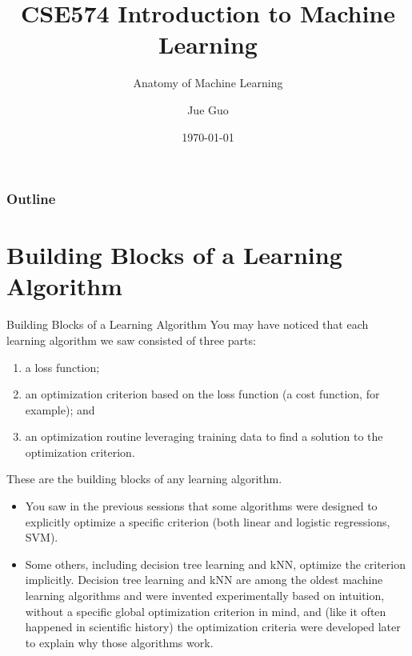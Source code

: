 \documentclass[9pt,dvipsnames]{beamer}
\title{CSE574 Introduction to Machine Learning}
\subtitle{Anatomy of Machine Learning}
\author{Jue Guo}
\institute{University at Buffalo}
\date{\today}
\begin{document}
\begin{frame}
    \titlepage
\end{frame}

\begin{frame}
    \frametitle{Outline}
    \tableofcontents
\end{frame}

\section{Building Blocks of a Learning Algorithm}
\begin{frame}{Building Blocks of a Learning Algorithm}
    You may have noticed that each learning algorithm we saw consisted of three parts:
    \begin{enumerate}
        \item a loss function;
        \item an optimization criterion based on the loss function (a cost function, for example); and
        \item an optimization routine leveraging training data to find a solution to the optimization criterion.
    \end{enumerate}
    These are the building blocks of any learning algorithm. 
   \begin{itemize}
	   	\item You saw in the previous sessions that some algorithms were designed to explicitly optimize a specific criterion (both linear and logistic regressions, SVM).
	   	\item Some others, including decision tree learning and kNN, optimize the criterion implicitly. Decision tree learning and kNN are among the oldest machine learning algorithms and were invented experimentally based on intuition, without a specific global optimization criterion in mind, and (like it often happened in scientific history) the optimization criteria were developed later to explain why those algorithms work.
   \end{itemize}
\end{frame}
\end{document}
